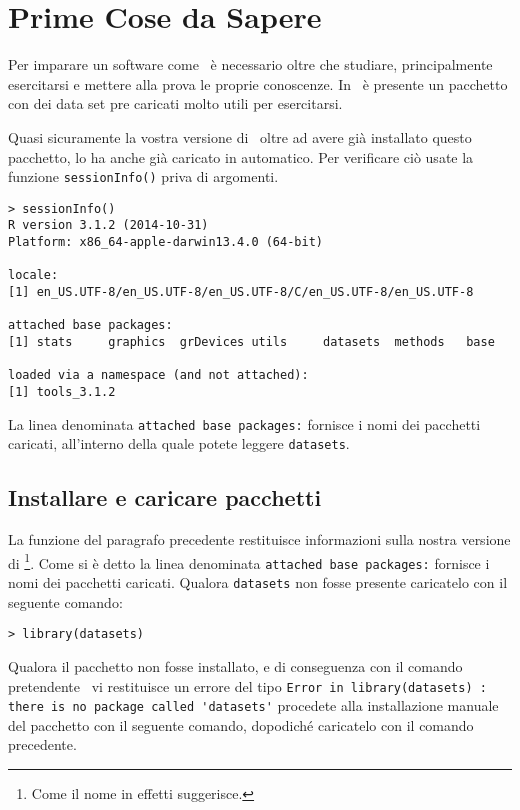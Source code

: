 \section{Prime Cose da Sapere}
Per imparare un software come \erre\ è necessario oltre che studiare, principalmente esercitarsi e mettere alla prova le proprie conoscenze. In \erre\ è presente un pacchetto con dei data set pre caricati molto utili per esercitarsi.

Quasi sicuramente la vostra versione di \erre\ oltre ad avere già installato questo pacchetto, lo ha anche già caricato in automatico. Per verificare ciò usate la funzione \lstinline!sessionInfo()! priva di argomenti.

\begin{lstlisting}
> sessionInfo()
R version 3.1.2 (2014-10-31)
Platform: x86_64-apple-darwin13.4.0 (64-bit)

locale:
[1] en_US.UTF-8/en_US.UTF-8/en_US.UTF-8/C/en_US.UTF-8/en_US.UTF-8

attached base packages:
[1] stats     graphics  grDevices utils     datasets  methods   base     

loaded via a namespace (and not attached):
[1] tools_3.1.2
\end{lstlisting}

La linea denominata \lstinline!attached base packages:! fornisce i nomi dei pacchetti caricati, all'interno della quale potete leggere \lstinline!datasets!.

\subsection{Installare e caricare pacchetti}
La funzione del paragrafo precedente restituisce informazioni sulla nostra versione di \erre\footnote{Come il nome in effetti suggerisce.}. Come si è detto la linea denominata \lstinline!attached base packages:! fornisce i nomi dei pacchetti caricati. Qualora \lstinline!datasets! non fosse presente caricatelo con il seguente comando:

\begin{lstlisting}
> library(datasets)
\end{lstlisting}

Qualora il pacchetto non fosse installato, e di conseguenza con il comando pretendente \erre\ vi restituisce un errore del tipo \lstinline!Error in library(datasets) : there is no package called 'datasets'!  procedete alla installazione manuale del pacchetto con il seguente comando, dopodiché caricatelo con il comando precedente.

